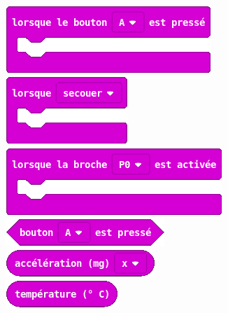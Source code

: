 \begin{minipage}[t]{0.25\linewidth}~\\
  \vspace{5mm}

    \includegraphics[scale=0.4]{res/blocsMkCd/MB_makecode_entrees-bouton.png}\\[0.5em]
    \includegraphics[scale=0.4]{res/blocsMkCd/MB_makecode_entrees-geste.png}\\[0.5em]
    \includegraphics[scale=0.4]{res/blocsMkCd/MB_makecode_entrees-broche.png}\\[0.5em]
    \includegraphics[scale=0.4]{res/blocsMkCd/MB_makecode_entrees-boutonPress.png}\\[0.5em]
    \includegraphics[scale=0.4]{res/blocsMkCd/MB_makecode_entrees-accel.png}\\[0.5em]
    \includegraphics[scale=0.4]{res/blocsMkCd/MB_makecode_entrees-temp.png}


\end{minipage}


